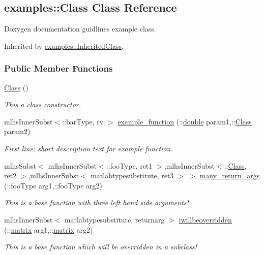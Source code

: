 \hypertarget{classexamples_1_1_class}{}\subsection{examples\+:\+:Class Class Reference}
\label{classexamples_1_1_class}


Doxygen documentation guidlines example class.  




Inherited by \hyperlink{classexamples_1_1_inherited_class}{examples\+::\+Inherited\+Class}.

\subsubsection*{Public Member Functions}
\begin{DoxyCompactItemize}
\item 
\hypertarget{classexamples_1_1_class_ad95c12eb9304ae72e1e7207bc7528cc5}{}\hyperlink{classexamples_1_1_class_ad95c12eb9304ae72e1e7207bc7528cc5}{Class} ()\label{classexamples_1_1_class_ad95c12eb9304ae72e1e7207bc7528cc5}

\begin{DoxyCompactList}\small\item\em This a class constructor. \end{DoxyCompactList}\item 
mlhs\+Inner\+Subst$<$\+::bar\+Type, rv $>$ \hyperlink{classexamples_1_1_class_a4ef013b3b72f538d2264c9e32aea0b34}{example\+\_\+function} (\+::\hyperlink{classdouble}{double} param1,\+::\hyperlink{classexamples_1_1_class}{Class} param2)
\begin{DoxyCompactList}\small\item\em First line\+: short description text for example function. \end{DoxyCompactList}\item 
mlhs\+Subst$<$ mlhs\+Inner\+Subst$<$\+::foo\+Type, ret1 $>$,mlhs\+Inner\+Subst$<$\+::\hyperlink{classexamples_1_1_class}{Class}, ret2 $>$,mlhs\+Inner\+Subst$<$ matlabtypesubstitute, ret3 $>$ $>$ \hyperlink{classexamples_1_1_class_a76a3cc79ec0d233b2019b14032251f18}{many\+\_\+return\+\_\+args} (\+::foo\+Type arg1,\+::foo\+Type arg2)
\begin{DoxyCompactList}\small\item\em This is a base function with three left hand side arguments! \end{DoxyCompactList}\item 
mlhs\+Inner\+Subst$<$ matlabtypesubstitute, returnarg $>$ \hyperlink{classexamples_1_1_class_a8e438183ee22174286ae657e0bab8721}{iwillbeoverridden} (\+::\hyperlink{classmatrix}{matrix} arg1,\+::\hyperlink{classmatrix}{matrix} arg2)
\begin{DoxyCompactList}\small\item\em This is a base function which will be overridden in a subclass! \end{DoxyCompactList}\end{DoxyCompactItemize}
